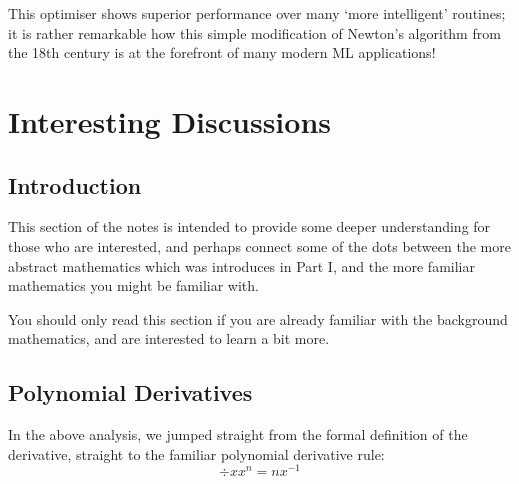 \documentclass[a4paper,openany,11pt]{book}
\begin{document}
				This optimiser shows superior performance over many `more intelligent' routines; it is rather remarkable how this simple modification of Newton's algorithm from the 18th century is at the forefront of many modern ML applications!

	\part{Interesting Discussions}
	
		\chapter{Introduction}

			\large This section of the notes is intended to provide some deeper understanding for those who are interested, and perhaps connect some of the dots between the more abstract mathematics which was introduces in Part I, and the more familiar mathematics you might be familiar with. 

			You should only read this section if you are already familiar with the background mathematics, and are interested to learn a bit more. 

		\chapter{Polynomial Derivatives}\label{Int:Polynomial}

			In the above analysis, we jumped straight from the formal definition of the derivative, straight to the familiar polynomial derivative rule:
			\begin{equation}
				\div{}{x} x^n = n x^{-1}
			\end{equation}
\end{document}
